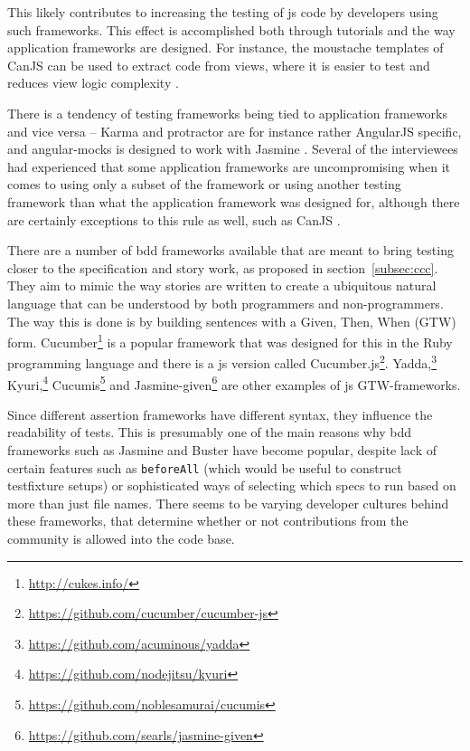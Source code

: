 \documentclass[11pt]{article}
\begin{document}
This likely contributes to increasing the testing of \gls{js} code by developers using such frameworks. This effect is accomplished both through tutorials and the way application frameworks are designed. For instance, the moustache templates of CanJS can be used to extract code from views, where it is easier to test and reduces view logic complexity \cite[question~32]{Ahnve}.

There is a tendency of testing frameworks being tied to application frameworks and vice versa -- Karma and protractor are for instance rather AngularJS specific, and angular-mocks is designed to work with Jasmine \cite[question~7]{Rovegard}. Several of the interviewees had experienced that some application frameworks are uncompromising when it comes to using only a subset of the framework or using another testing framework than what the application framework was designed for, although there are certainly exceptions to this rule as well, such as CanJS \cite[question~22]{Ahnve}\cite[question~41]{Rovegard}.

There are a number of \gls{bdd} frameworks available that are meant to bring testing closer to the specification and story work, as proposed in section~\ref{subsec:ccc}. They aim to mimic the way stories are written to create a ubiquitous natural language that can be understood by both programmers and non-programmers. The way this is done is by building sentences with a Given, Then, When (GTW) form. Cucumber\footnote{\url{http://cukes.info/}} is a popular framework that was designed for this in the Ruby programming language and there is a \gls{js} version called Cucumber.js\footnote{\url{https://github.com/cucumber/cucumber-js}}.
Yadda,\footnote{\url{https://github.com/acuminous/yadda}}
Kyuri,\footnote{\url{https://github.com/nodejitsu/kyuri}}
Cucumis\footnote{\url{https://github.com/noblesamurai/cucumis}} and
Jasmine-given\footnote{\url{https://github.com/searls/jasmine-given}}
are other examples of \gls{js} GTW-frameworks. \cite[section 8.4]{BDDJS}

Since different assertion frameworks have different syntax, they influence the readability of tests. This is presumably one of the main reasons why \gls{bdd} frameworks such as Jasmine and Buster have become popular, despite lack of certain features such as \texttt{beforeAll} (which would be useful to construct \gls{testfixture} setups) or sophisticated ways of selecting which specs to run based on more than just file names. There seems to be varying developer cultures behind these frameworks, that determine whether or not contributions from the community is allowed into the code base. \cite[question~7]{Ahnve}\cite[question~5-6]{Rovegard}
\end{document}
